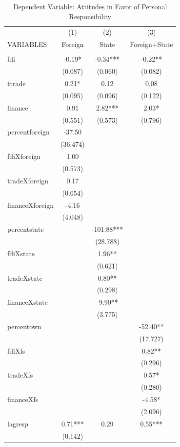 \documentclass[12pt]{report}
\begin{document}
\begin{table}[htdp]
\caption{Dependent Variable: Attitudes in Favor of Personal Responsibility}
\vspace{2em}
\begin{center}
{\scriptsize
\begin{tabular}{lccc} \hline  & (1) & (2) & (3) \\ VARIABLES &
Foreign & State & Foreign+State \\ \hline  &  &
 &  \\ fdi & -0.19* &
-0.34*** & -0.22** \\  & (0.087) &
(0.060) & (0.082) \\
ttrade & 0.21* & 0.12 & 0.08 \\  & (0.095) &
(0.096) & (0.122) \\
finance & 0.91 & 2.82*** & 2.03* \\  & (0.551) &
(0.573) & (0.796) \\
percentforeign & -37.50 &  &  \\  & (36.474) &
 &  \\ fdiXforeign &
1.00 &  &  \\  & (0.573) &
 &  \\ tradeXforeign &
0.17 &  &  \\  & (0.654) &
 &  \\ financeXforeign &
-4.16 &  &  \\  & (4.048) &
 &  \\ percentstate &  &
-101.88*** &  \\  &  &
(28.788) &  \\ fdiXstate
&  & 1.96** &  \\  &  &
(0.621) &  \\
tradeXstate &  & 0.80** &  \\  &  &
(0.298) &  \\
financeXstate &  & -9.90** &  \\  &  &
(3.775) &  \\ percentown
&  &  & -52.40** \\  &  &
 & (17.727) \\ fdiXfs &
&  & 0.82** \\  &  &
 & (0.296) \\ tradeXfs &
&  & 0.57* \\  &  &
 & (0.280) \\ financeXfs
&  &  & -4.58* \\  &  &
 & (2.096) \\ lagresp &
0.71*** & 0.29 & 0.55*** \\  & (0.142) &

\end{tabular}}
\end{center}
\end{table}
\end{document}
